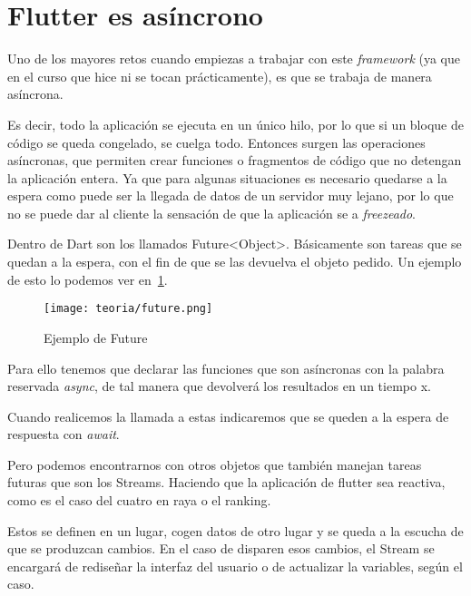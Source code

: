 \section{Flutter es asíncrono}
Uno de los mayores retos cuando empiezas a trabajar con este \emph{framework} (ya que en el curso que hice ni se tocan prácticamente), es que se trabaja de manera asíncrona.

Es decir, todo la aplicación se ejecuta en un único hilo, por lo que si un bloque de código se queda congelado, se cuelga todo. Entonces surgen las operaciones asíncronas, que permiten crear funciones o fragmentos de código que no detengan la aplicación entera. Ya que para algunas situaciones es necesario quedarse a la espera como puede ser la llegada de datos de un servidor muy lejano, por lo que no se puede dar al cliente la sensación de que la aplicación se a \emph{freezeado}.

Dentro de Dart son los llamados Future<Object>. Básicamente son tareas que se quedan a la espera, con el fin de que se las devuelva el objeto pedido. Un ejemplo de esto lo podemos ver en~\ref{fig:future}.

\begin{figure}[H]
	\centering
	\texttt{[image: teoria/future.png]}
	\caption{Ejemplo de Future}\label{fig:future}
\end{figure}

Para ello tenemos que declarar las funciones que son asíncronas con la palabra reservada \emph{async}, de tal manera que devolverá los resultados en un tiempo x.

Cuando realicemos la llamada a estas indicaremos que se queden a la espera de respuesta con \emph{await}.

Pero podemos encontrarnos con otros objetos que también manejan tareas futuras que son los Streams. Haciendo que la aplicación de flutter sea reactiva, como es el caso del cuatro en raya o el ranking.

Estos se definen en un lugar, cogen datos de otro lugar y se queda a la escucha de que se produzcan cambios. En el caso de disparen esos cambios, el Stream se encargará de rediseñar la interfaz del usuario o de actualizar la variables, según el caso.

%

